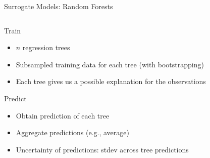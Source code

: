 \begin{frame}[c]{Surrogate Models: Random Forests}

\begin{columns}[T] %
\begin{column}{.48\textwidth}


\begin{block}{Train}
\begin{itemize}
	\item $n$ regression trees
	\item Subsampled training data for each tree (with bootstrapping)
	\item Each tree gives us a possible explanation for the observations
\end{itemize}
\end{block}

\pause
    \begin{block}{Predict}
    \begin{itemize}
    	\item Obtain prediction of each tree
    	\item Aggregate predictions (e.g., average)
    	\item Uncertainty of predictions: stdev across tree predictions
    \end{itemize}
    \end{block}

\end{column}%


\hfill%

\begin{column}{.48\textwidth}
\end{column}
\end{columns}

\end{frame}

